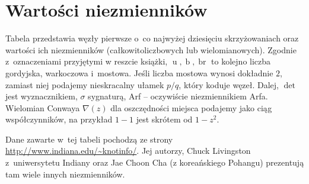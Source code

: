 \section{Wartości niezmienników}
\label{sec:table_of_invariants}
Tabela przedstawia węzły pierwsze o~co najwyżej dziesięciu skrzyżowaniach oraz wartości ich niezmienników (całkowitoliczbowych lub wielomianowych).
Zgodnie z~oznaczeniami przyjętymi w reszcie książki, $\operatorname{u}, \operatorname{b}, \operatorname{br}$ to kolejno liczba gordyjska, warkoczowa i~mostowa.
Jeśli liczba mostowa wynosi dokładnie $2$, zamiast niej podajemy nieskracalny ułamek $p/q$, który koduje węzeł.
Dalej, $\det$ jest wyznacznikiem, $\sigma$ sygnaturą, Arf -- oczywiście niezmiennikiem Arfa.
Wielomian Conwaya $\nabla(z)$ dla oszczędności miejsca podajemy jako ciąg współczynników, na przykład $1-1$ jest skrótem od $1-z^2$.

Dane zawarte w~tej tabeli pochodzą ze strony \url{http://www.indiana.edu/~knotinfo/}.
Jej autorzy, Chuck Livingston z~uniwersytetu Indiany  oraz Jae Choon Cha (z koreańskiego Pohangu) prezentują tam wiele innych niezmienników.

